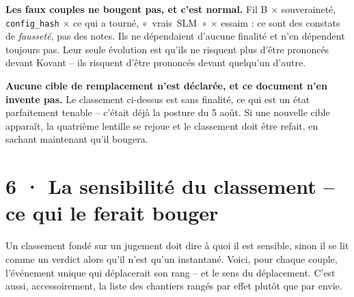 \documentclass[10pt]{article}
\newcommand{\code}[1]{\texttt{\small #1}}
\newcommand{\x}{$\times$}
\begin{document}
\textbf{Les faux couples ne bougent pas, et c'est normal.} Fil B \x{} souveraineté, \code{config\_hash}
\x{} ce qui a tourné, \mbox{« vrais SLM »} \x{} essaim : ce sont des constats de \emph{fausseté}, pas
des notes. Ils ne dépendaient d'aucune finalité et n'en dépendent toujours pas. Leur seule évolution est
qu'ils ne risquent plus d'être prononcés devant Kovant -- ils risquent d'être prononcés devant
quelqu'un d'autre.

\textbf{Aucune cible de remplacement n'est déclarée, et ce document n'en invente pas.} Le classement
ci-dessus est sans finalité, ce qui est un état parfaitement tenable -- c'était déjà la posture du
5 août. Si une nouvelle cible apparaît, la quatrième lentille se rejoue et le classement doit être
refait, en sachant maintenant qu'il bougera.

\section{6 · La sensibilité du classement -- ce qui le ferait bouger}

Un classement fondé sur un jugement doit dire à quoi il est sensible, sinon il se lit comme un verdict
alors qu'il n'est qu'un instantané. Voici, pour chaque couple, l'événement unique qui déplacerait son
rang -- et le sens du déplacement. C'est aussi, accessoirement, la liste des chantiers rangés par
effet plutôt que par envie.
\end{document}
